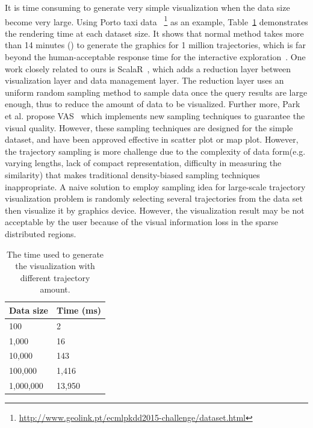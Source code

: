 It is time consuming to generate very simple visualization when the data size become very large. Using Porto taxi data ~\footnote{\url{http://www.geolink.pt/ecmlpkdd2015-challenge/dataset.html}} as an example, Table~\ref{table:rendering_time} demonstrates the rendering time at each dataset size.  It shows that normal method takes more than 14 minutes () to generate the graphics for 1 million trajectories, which is far beyond the human-acceptable response time for the interactive exploration~\cite{shneiderman1984response}.
One work closely related to ours is ScalaR~\cite{battle2013dynamic}, which adds a reduction layer between visualization layer and data management layer. The reduction layer uses an uniform random sampling method to sample data once the query results are large enough, thus to reduce the amount of data to be visualized.
Further more, Park et al. propose VAS~\cite{park2016visualization} which implements new sampling techniques to guarantee the visual quality. However, these sampling techniques are designed for the simple dataset, and have been approved effective in scatter plot or map plot. However, the trajectory sampling is more challenge due to the complexity of data form(e.g. varying lengths, lack of compact representation, difficulty in measuring the similarity) that makes traditional density-biased sampling techniques inappropriate. 
A naive solution to employ sampling idea for large-scale trajectory visualization problem is randomly selecting several trajectories from the data set then visualize it by graphics device.
However, the visualization result may be not acceptable by the user because of the visual information loss in the sparse distributed regions.


\begin{table}[h!]
	\centering
	\caption{The time used to generate the visualization with different trajectory amount.  }
	\begin{tabular}{m{2.5cm}|m{2.5cm}} 
		\hline
		   Data size & Time (ms) \\ 
		\hline
		100& 2\\
		\hline
		1,000& 16\\
		\hline
		10,000& 143\\
		\hline
		100,000& 1,416\\
		\hline
		1,000,000& 13,950\\
		\hline
	\end{tabular}
	\label{table:rendering_time}
\end{table}


